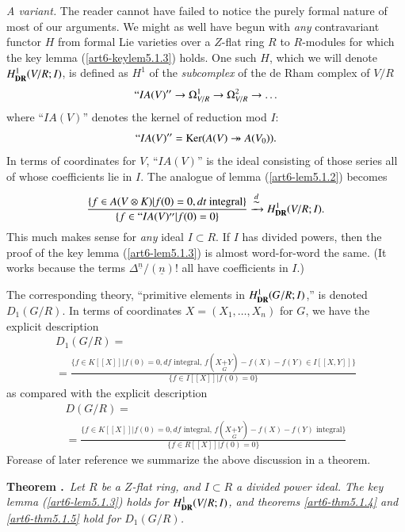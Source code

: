 \noindent
{\em A variant.} The reader cannot have failed to notice the purely formal nature of most of our arguments. We might as well have begun with {\em any} contravariant functor $H$ from formal Lie varieties over a $Z$-flat ring $R$ to $R$-modules for which the key lemma (\ref{art6-keylem5.1.3}) holds. One such $H$, which we will denote $H^{1}_{\mathbf{DR}}(V/R;I)$, is defined as $H^{1}$ of the {\em subcomplex} of the de Rham complex of $V/R$
$$
``IA(V)''\to \Omega^{1}_{V/R}\to \Omega^{2}_{V/R}\to \ldots
$$
where ``$IA(V)$'' denotes the kernel of reduction mod $I$:
$$
``IA(V)''=\operatorname{Ker}(A(V)\twoheadrightarrow A(V_{0})).
$$
In terms of coordinates for $V$, ``$IA(V)$'' is the ideal consisting of those series all of whose coefficients lie in $I$. The analogue of lemma (\ref{art6-lem5.1.2}) becomes
$$
\frac{\{f\in A(V\otimes K)|f(0)=0,dt\text{~integral}\}}{\{f\in ``IA(V)''|f(0)=0\}}\xrightarrow{\displaystyle{\mathop{\sim}\limits^{d}}}H^{1}_{\mathbf{DR}}(V/R;I).
$$
This much makes sense for {\em any} ideal $I\subset R$. If $I$ has divided powers, then the proof of the key lemma (\ref{art6-lem5.1.3}) is almost word-for-word the same. (It works because the terms $\Delta^{\underline{n}}/(\underline{n})!$ all have coefficients in $I$.)

The corresponding theory, ``primitive elements in $H^{1}_{\mathbf{DR}}(G/R;I)$,'' is denoted $D_{1}(G/R)$. In terms of coordinates $X=(X_{1},\ldots,X_{n})$ for $G$, we have the explicit description
{\fontsize{10}{12}\selectfont
\begin{multline*}
D_{1}(G/R)=\\
=\frac{\{f\in K[[X]]|f(0)=0,df\text{~integral, } f(X{\displaystyle{\mathop{+}\limits_{G}}Y})-f(X)-f(Y)\in I[[X,Y]]\}}{\{f\in I[[X]]|f(0)=0\}}
\end{multline*}}\relax
as compared with the explicit description
\begin{multline*}
D(G/R)=\\
=\frac{\{f\in K[[X]]|f(0)=0,df\text{~integral, } f(X{\displaystyle{\mathop{+}\limits_{G}}Y})-f(X)-f(Y)\text{~integral}\}}{\{f\in R[[X]]|f(0)=0\}}
\end{multline*}
For\pageoriginale ease of later reference we summarize the above discussion in a theorem.

\medskip
\noindent
{\bf Theorem .\label{art6-thm5.1.6}}~{\em Let $R$ be a $Z$-flat ring, and $I\subset R$ a divided power ideal. The key lemma (\ref{art6-lem5.1.3}) holds for $H^{1}_{\mathbf{DR}}(V/R;I)$, and theorems \eqref{art6-thm5.1.4} and \eqref{art6-thm5.1.5} hold for $D_{1}(G/R)$.}
\smallskip

